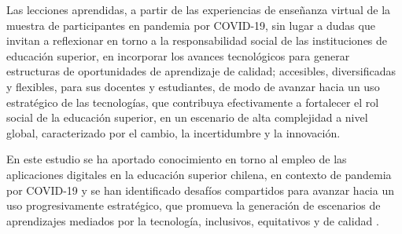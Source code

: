 \documentclass[spanish]{textolivre}
\begin{document}
Las lecciones aprendidas, a partir de las experiencias de enseñanza virtual de la muestra de participantes en pandemia por  COVID-19, sin lugar a dudas que  invitan a reflexionar en torno a la responsabilidad social de las instituciones de educación superior,  en  incorporar los avances tecnológicos para generar estructuras de oportunidades de aprendizaje  de calidad; accesibles, diversificadas y flexibles, para sus docentes y estudiantes, de modo de avanzar hacia un uso estratégico de las tecnologías, que contribuya efectivamente a fortalecer  el  rol social de la educación superior, en un escenario de alta complejidad a nivel global, caracterizado por el cambio,  la  incertidumbre y la innovación.

En este estudio se ha aportado conocimiento en torno al empleo de las aplicaciones digitales en la educación superior chilena, en contexto de pandemia por  COVID-19 y  se han identificado desafíos compartidos para avanzar hacia un  uso  progresivamente estratégico, que promueva la generación  de escenarios de aprendizajes mediados por la tecnología, inclusivos, equitativos y de  calidad \cite{instituto_internacional_para_la_educacion_superior_en_america_latina_y_el_caribe_covid-19_2020}.
\end{document}
